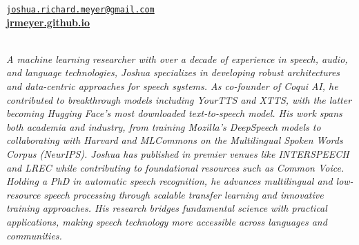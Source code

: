 \documentclass{cv} %
\begin{document}
\vspace{-.25cm}
\begin{center}
\href{mailto:joshua.richard.meyer@gmail.com}{\nolinkurl{joshua.richard.meyer@gmail.com}}\\
\vspace{.15cm}
\href{https://jrmeyer.github.io}{\textbf{jrmeyer.github.io}} \\
\vspace{.15cm}
 \href{https://www.linkedin.com/in/josh-r-meyer/}{\faLinkedin} \hspace{.25cm} \href{https://github.com/JRMeyer}{\faGithub} \hspace{.25cm} \href{https://wa.me/14155899933}{\faWhatsapp} \\

\vspace{.5cm}

\textit{A machine learning researcher with over a decade of experience in speech, audio, and language technologies, Joshua specializes in developing robust architectures and data-centric approaches for speech systems. As co-founder of Coqui AI, he contributed to breakthrough models including YourTTS and XTTS, with the latter becoming Hugging Face's most downloaded text-to-speech model. His work spans both academia and industry, from training Mozilla's DeepSpeech models to collaborating with Harvard and MLCommons on the Multilingual Spoken Words Corpus (NeurIPS). Joshua has published in premier venues like INTERSPEECH and LREC while contributing to foundational resources such as Common Voice. Holding a PhD in automatic speech recognition, he advances multilingual and low-resource speech processing through scalable transfer learning and innovative training approaches. His research bridges fundamental science with practical applications, making speech technology more accessible across languages and communities.}

\vspace{.5cm}
\end{center}

\vspace{.25cm}
\end{document}
